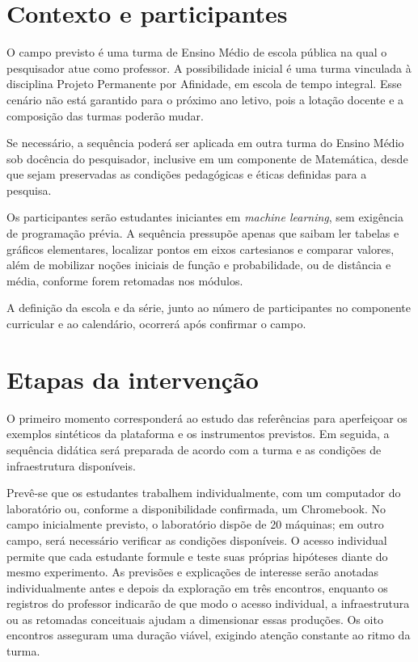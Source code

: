 \section{Contexto e participantes}

O campo previsto é uma turma de Ensino Médio de escola pública na qual o pesquisador atue como professor. A possibilidade inicial é uma turma vinculada à disciplina Projeto Permanente por Afinidade, em escola de tempo integral. Esse cenário não está garantido para o próximo ano letivo, pois a lotação docente e a composição das turmas poderão mudar.

Se necessário, a sequência poderá ser aplicada em outra turma do Ensino Médio sob docência do pesquisador, inclusive em um componente de Matemática, desde que sejam preservadas as condições pedagógicas e éticas definidas para a pesquisa.

Os participantes serão estudantes iniciantes em \textit{machine learning}, sem exigência de programação prévia. A sequência pressupõe apenas que saibam ler tabelas e gráficos elementares, localizar pontos em eixos cartesianos e comparar valores, além de mobilizar noções iniciais de função e probabilidade, ou de distância e média, conforme forem retomadas nos módulos.

A definição da escola e da série, junto ao número de participantes no componente curricular e ao calendário, ocorrerá após confirmar o campo.

\section{Etapas da intervenção}

O primeiro momento corresponderá ao estudo das referências para aperfeiçoar os exemplos sintéticos da plataforma e os instrumentos previstos. Em seguida, a sequência didática será preparada de acordo com a turma e as condições de infraestrutura disponíveis.

Prevê-se que os estudantes trabalhem individualmente, com um computador do laboratório ou, conforme a disponibilidade confirmada, um Chromebook. No campo inicialmente previsto, o laboratório dispõe de 20 máquinas; em outro campo, será necessário verificar as condições disponíveis. O acesso individual permite que cada estudante formule e teste suas próprias hipóteses diante do mesmo experimento. As previsões e explicações de interesse serão anotadas individualmente antes e depois da exploração em três encontros, enquanto os registros do professor indicarão de que modo o acesso individual, a infraestrutura ou as retomadas conceituais ajudam a dimensionar essas produções. Os oito encontros asseguram uma duração viável, exigindo atenção constante ao ritmo da turma.

